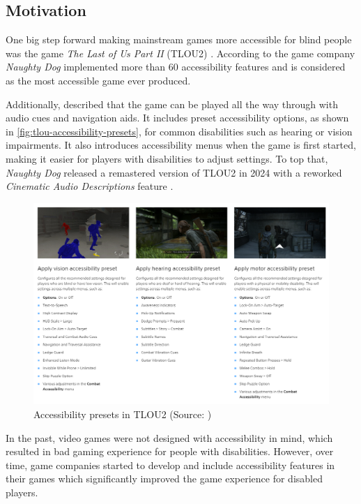 \documentclass[sigconf,natbib=false,10pt]{acmart}
\begin{document}
	\subsection{Motivation}
	One big step forward making mainstream games more accessible for blind people was the game \emph{The Last of Us Part II} (TLOU2) \cite{playstation_last_2020, playstation_last_2020-1}. 
	According to \textcite{leite_extended_2021} the game company \emph{Naughty Dog} implemented more than 60 accessibility features and is considered as the most accessible game ever produced.

	Additionally, \textcite{dale_last_2024} described that the game can be played all the way through with audio cues and navigation aids.
	It includes preset accessibility options, as shown in \autoref{fig:tlou-accessibility-presets}, for common disabilities such as hearing or vision impairments.
	It also introduces accessibility menus when the game is first started, making it easier for players with disabilities to adjust settings.
	To top that, \emph{Naughty Dog} released a remastered version of TLOU2 in 2024 with a reworked \emph{Cinematic Audio Descriptions} feature \cite{playstation_last_2024}.

	\begin{figure}[ht]
		\centering
		\includegraphics[scale=0.6,width=\textwidth]{assets/tlou-accessibility-presets.png}
		\caption{Accessibility presets in TLOU2 (Source: \textcite{playstation_last_2020-1})}
		\label{fig:tlou-accessibility-presets}
	\end{figure}

	In the past, video games were not designed with accessibility in mind, which resulted in bad gaming experience for people with disabilities. 
	However, over time, game companies started to develop and include accessibility features in their games which significantly improved the game experience for disabled players.
	
\end{document}
